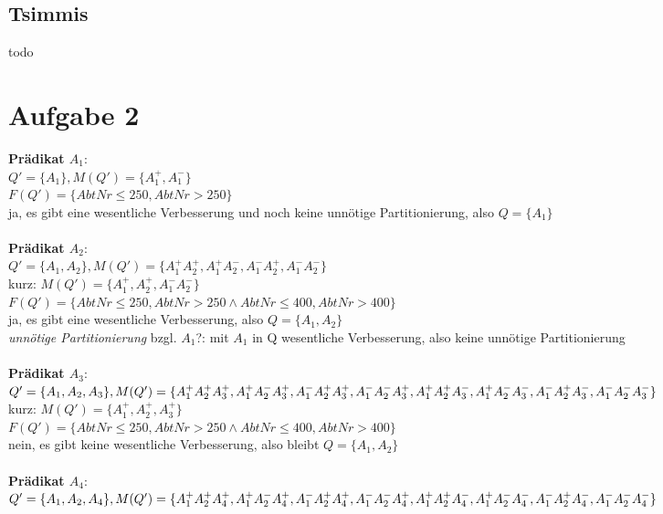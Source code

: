 \documentclass[a4paper]{article}
\begin{document}
\subsection*{Tsimmis}
todo



\section*{Aufgabe 2}
\textbf{Prädikat $ A_1 $}:\\
$ Q' = \{ A_1 \}, M(Q') = \{ A_1^+, A_1^-\} $\\
$ F(Q') = \{ AbtNr\leq 250, AbtNr>250\} $\\
ja, es gibt eine wesentliche Verbesserung und noch keine unnötige Partitionierung, also $ Q = \{ A_1 \} $\\
\\
\textbf{Prädikat $ A_2 $}:\\
$ Q' = \{ A_1, A_2 \}, M(Q') = \{ A_1^+ A_2^+, A_1^+ A_2^-, A_1^- A_2^+, A_1^- A_2^-\} $\\
kurz: $ M(Q') = \{ A_1^+, A_2^+, A_1^- A_2^-\} $\\
$ F(Q') = \{ AbtNr\leq 250, AbtNr>250 \wedge AbtNr \leq 400, AbtNr > 400 \} $\\
ja, es gibt eine wesentliche Verbesserung, also $ Q = \{ A_1, A_2 \} $ \\
\textit{unnötige Partitionierung} bzgl. $ A_1 $?: mit $ A_1 $ in Q wesentliche Verbesserung, also keine unnötige Partitionierung\\
\\
\textbf{Prädikat $ A_3 $}:\\
$ Q' = \{ A_1, A_2, A_3 \}, \\
M(Q') = \{ A_1^+ A_2^+ A_3^+, A_1^+ A_2^- A_3^+, A_1^- A_2^+ A_3^+, A_1^- A_2^- A_3^+, A_1^+ A_2^+ A_3^-, A_1^+ A_2^- A_3^-, A_1^- A_2^+ A_3^-, A_1^- A_2^- A_3^-\} $\\
kurz: $ M(Q') = \{ A_1^+, A_2^+, A_3^+ \} $\\
$ F(Q') = \{ AbtNr\leq 250, AbtNr>250 \wedge AbtNr \leq 400, AbtNr > 400 \} $\\
nein, es gibt keine wesentliche Verbesserung, also bleibt $ Q = \{ A_1, A_2 \} $ \\
\\
\textbf{Prädikat $ A_4 $}:\\
$ Q' = \{ A_1, A_2, A_4 \}, \\
M(Q') = \{ A_1^+ A_2^+ A_4^+, A_1^+ A_2^- A_4^+, A_1^- A_2^+ A_4^+, A_1^- A_2^- A_4^+, A_1^+ A_2^+ A_4^-, A_1^+ A_2^- A_4^-, A_1^- A_2^+ A_4^-, A_1^- A_2^- A_4^-\} $\\
\end{document}

